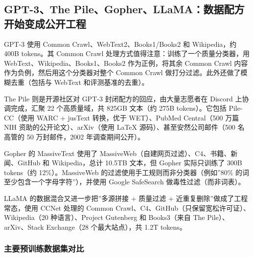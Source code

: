 \subsection{GPT-3、The Pile、Gopher、LLaMA：数据配方开始变成公开工程}

GPT-3 使用 Common Crawl、WebText2、Books1/Books2 和 Wikipedia，约 400B tokens。其 Common Crawl 处理方式值得注意：训练了一个质量分类器，用 WebText、Wikipedia、Books1、Books2 作为正例，将其余 Common Crawl 内容作为负例，然后用这个分类器对整个 Common Crawl 做打分过滤。此外还做了模糊去重（包括与 WebText 和评测基准的去重）。

The Pile 则是开源社区对 GPT-3 封闭配方的回应，由大量志愿者在 Discord 上协调完成，汇聚 22 个高质量域，共 825GB 文本（约 275B tokens）。它包括 Pile-CC（使用 WARC + jusText 转换，优于 WET）、PubMed Central（500 万篇 NIH 资助的公开论文）、arXiv（使用 LaTeX 源码）、甚至安然公司邮件（500 名高管的 50 万封邮件，2002 年调查期间公开）。

Gopher 的 MassiveText 使用了 MassiveWeb（自建网页过滤）、C4、书籍、新闻、GitHub 和 Wikipedia，总计 10.5TB 文本，但 Gopher 实际只训练了 300B tokens（约 12\%）。MassiveWeb 的过滤使用手工规则而非分类器（例如”80\% 的词至少包含一个字母字符”），并使用 Google SafeSearch 做毒性过滤（而非词表）。

LLaMA 的数据混合又进一步把”多源拼接 + 质量过滤 + 近重复删除”做成了工程常态，使用 CCNet 处理的 Common Crawl、C4、GitHub（只保留宽松许可证）、Wikipedia（20 种语言）、Project Gutenberg 和 Books3（来自 The Pile）、arXiv、Stack Exchange（28 个最大站点），共 1.2T tokens。

\subsubsection{主要预训练数据集对比}

